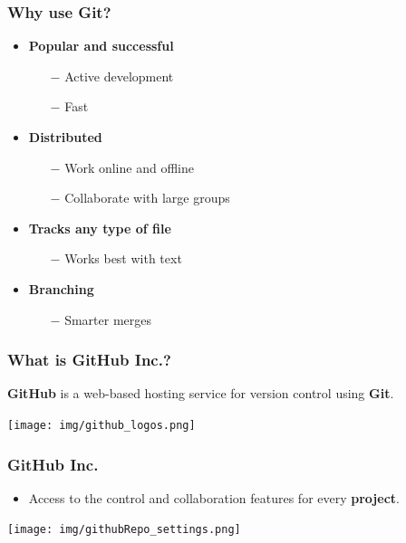 \documentclass[svgnames]{beamer}
\begin{document}
\begin{frame}
    \frametitle{Why use Git?}
    \begin{itemize}
        \item \textbf{Popular and successful}
            \begin{itemize}
                \item[$-$]{Active development}
                \item[$-$]{Fast}
                    \hfill \break
            \end{itemize}

        \item \textbf{Distributed}
            \begin{itemize}
                \item[$-$]{Work online and offline}
                \item[$-$]{Collaborate with large groups}
                    \hfill \break
            \end{itemize}

        \item \textbf{Tracks any type of file}
            \begin{itemize}
                \item[$-$]{Works best with text}
                    \hfill \break
            \end{itemize}

        \item \textbf{Branching}
            \begin{itemize}
                \item[$-$]{Smarter merges}
            \end{itemize}
    \end{itemize}
\end{frame}


\begin{frame}
    \frametitle{What is GitHub Inc.?}

    \begin{center}
        \textbf{GitHub} is a web-based hosting service for version control using \textbf{Git}.
    \end{center}

    \begin{center}
        \texttt{[image: img/github\_logos.png]}
    \end{center}
\end{frame}


\begin{frame}
\frametitle{GitHub Inc.}
  \begin{itemize}
  \item Access to the control and collaboration features for every \textbf{project}.
  \end{itemize}

\begin{center}
\texttt{[image: img/githubRepo\_settings.png]}
\end{center}   

\end{frame}
\end{document}
